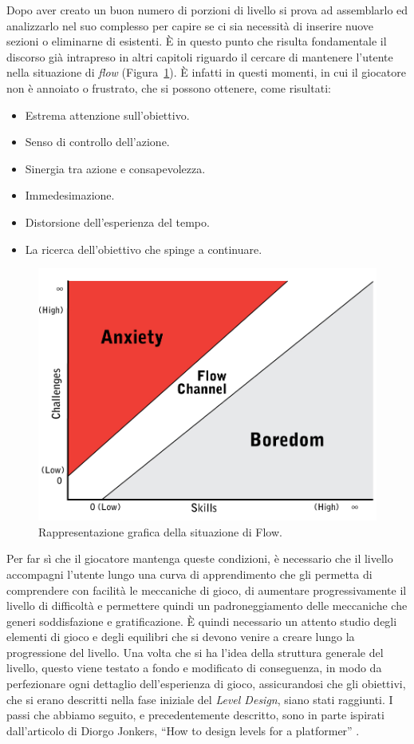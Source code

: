 Dopo aver creato un buon numero di porzioni di livello si prova ad assemblarlo ed analizzarlo nel suo complesso per capire se ci sia necessità di inserire nuove sezioni o eliminarne di esistenti.
È in questo punto che risulta fondamentale il discorso già intrapreso in altri capitoli riguardo il cercare di mantenere l’utente nella situazione di \textit{flow} (Figura~\ref{fig:level_design_flow}). È infatti in questi momenti, in cui il giocatore non è annoiato o frustrato, che si possono ottenere, come risultati:

\begin{itemize}
	\item Estrema attenzione sull’obiettivo.
	\item Senso di controllo dell’azione.
	\item Sinergia tra azione e consapevolezza.
	\item Immedesimazione.
	\item Distorsione dell’esperienza del tempo.
	\item La ricerca dell’obiettivo che spinge a continuare.
\end{itemize}

\begin{figure}%
	\centering
	\includegraphics[width= 0.8\columnwidth]{images/gameDesign/36_flow.jpg}
	\caption{Rappresentazione grafica della situazione di Flow.}
	\label{fig:level_design_flow}
\end{figure}

Per far sì che il giocatore mantenga queste condizioni, è necessario che il livello accompagni l’utente lungo una curva di apprendimento che gli permetta di comprendere con facilità le meccaniche di gioco, di aumentare progressivamente il livello di difficoltà e permettere quindi un padroneggiamento delle meccaniche che generi soddisfazione e gratificazione.
È quindi necessario un attento studio degli elementi di gioco e degli equilibri che si devono venire a creare lungo la progressione del livello.
Una volta che si ha l’idea della struttura generale del livello, questo viene testato a fondo e modificato di conseguenza, in modo da perfezionare ogni dettaglio dell’esperienza di gioco, assicurandosi che gli obiettivi, che si erano descritti nella fase iniziale del \textit{Level Design}, siano stati raggiunti.
I passi che abbiamo seguito, e precedentemente descritto, sono in parte ispirati dall’articolo di Diorgo Jonkers, “How to design levels for a platformer” \cite{DiorgoJonkersArticle}.

